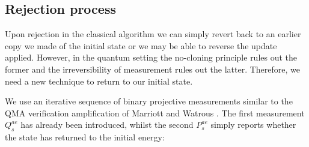 \documentclass[aps,floatfix,10pt,amssymb,amsfont,amsmath,superscriptaddress,float,nofootinbib,longbibliography,nobalancelastpage,twocolumn]{revtex4-2}
\begin{document}
\subsection{Rejection process}
Upon rejection in the classical algorithm we can simply revert back to an earlier copy we made of the initial state or we may be able to reverse the update applied. However, in the quantum setting the no-cloning principle rules out the former and the irreversibility of measurement rules out the latter. Therefore, we need a new technique to return to our initial state.

We use an iterative sequence of binary projective measurements similar to the QMA verification amplification of Marriott and Watrous \cite{MarriottWatrous}. The first measurement $Q_s^{ae}$ has already been introduced, whilst the second $P_s^{ae}$ simply reports whether the state has returned to the initial energy:
\end{document}
